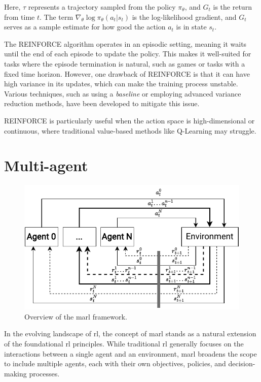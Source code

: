 Here, \(\tau\) represents a trajectory sampled from the policy \(\pi_\theta\), and \(G_t\) is the return from time \(t\). 
 The term \(\nabla_\theta \log \pi_\theta(a_t | s_t)\) is the log-likelihood gradient, 
 and \(G_t\) serves as a sample estimate for how good the action \(a_t\) is in state \(s_t\).

The REINFORCE algorithm operates in an episodic setting, 
 meaning it waits until the end of each episode to update the policy. 
 This makes it well-suited for tasks where the episode termination is natural, such as games or tasks with a fixed time horizon. 
 However, one drawback of REINFORCE is that it can have high variance in its updates, which can make the training process unstable. 
 Various techniques, such as using a \emph{baseline} or employing advanced variance reduction methods, have been developed to mitigate this issue.

REINFORCE is particularly useful when the action space is high-dimensional or continuous, where traditional value-based methods like Q-Learning may struggle. 


\section{Multi-agent}
\begin{figure}
\includegraphics[width=\textwidth]{chapters/img/multi-agent-rl.drawio.pdf}
\caption{Overview of the \ac{marl} framework.}\label{fig:marl:overview}
\end{figure}
In the evolving landscape of \ac{rl}, the concept of \ac{marl} stands as a natural extension of the foundational \ac{rl} principles. 
 While traditional \ac{rl} generally focuses on the interactions between a single agent and an environment, 
 \ac{marl} broadens the scope to include multiple agents, 
 each with their own objectives, policies, and decision-making processes.

